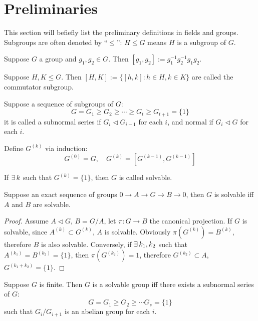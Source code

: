 \section{Preliminaries}
\begin{remark}
    This section will befiefly list the preliminary definitions in fields and groups. Subgroups are often denoted by ``$\le$'': $H\le G$ means $H$ is a subgroup of $G$.
\end{remark}
\begin{definition}
    Suppose $G$ a group and $g_1,g_2\in G$. Then $[g_1,g_2]:=g_1^{-1}g_2^{-1}g_1g_2$.
\end{definition}
\begin{definition}
    Suppose $H,K\le G$. Then $[H,K]:=\{[h,k]:h\in H,k\in K\}$ are called the commutator subgroup.
\end{definition}
\begin{definition}
    Suppose a sequence of subgroups of $G$:
    $$
    G=G_1\ge G_2\ge\cdots\ge G_t\ge G_{t+1}=\{1\}
    $$
    it is called a subnormal series if $G_i\triangleleft G_{i-1}$ for each $i$, and normal if $G_i\triangleleft G$ for each $i$.
\end{definition}
\begin{definition}
    Define $G^{(k)}$ via induction:
    $$
    G^{(0)}=G,\quad G^{(k)}=[G^{(k-1)},G^{(k-1)}]
    $$
\end{definition}
\begin{definition}
    If $\exists\, k$ such that $G^{(k)}=\{1\}$, then $G$ is called solvable.
\end{definition}
\begin{proposition}
    Suppose an exact sequence of groups $0\to A\to G\to B\to 0$, then $G$ is solvable iff $A$ and $B$ are solvable.
\end{proposition}
\begin{proof}
    Assume $A\triangleleft G$, $B=G/A$, let $\pi:G\to B$ the canonical projection. If $G$ is solvable, since $A^{(k)}\subset G^{(k)}$, $A$ is solvable. Obviously $\pi(G^{(k)})=B^{(k)}$, therefore $B$ is also solvable. Conversely, if $\exists\, k_1,k_2$ such that $A^{(k_1)}=B^{(k_2)}=\{1\}$, then $\pi(G^{(k_2)})=1$, therefore $G^{(k_2)}\subset A$, $G^{(k_1+k_2)}=\{1\}$.
\end{proof}
\begin{proposition}
    Suppose $G$ is finite. Then $G$ is a solvable group iff there exists a subnormal series of $G$:
    $$
    G=G_1\ge G_2\ge\cdots G_s=\{1\}
    $$
    such that $G_i/G_{i+1}$ is an abelian group for each $i$.
\end{proposition}

